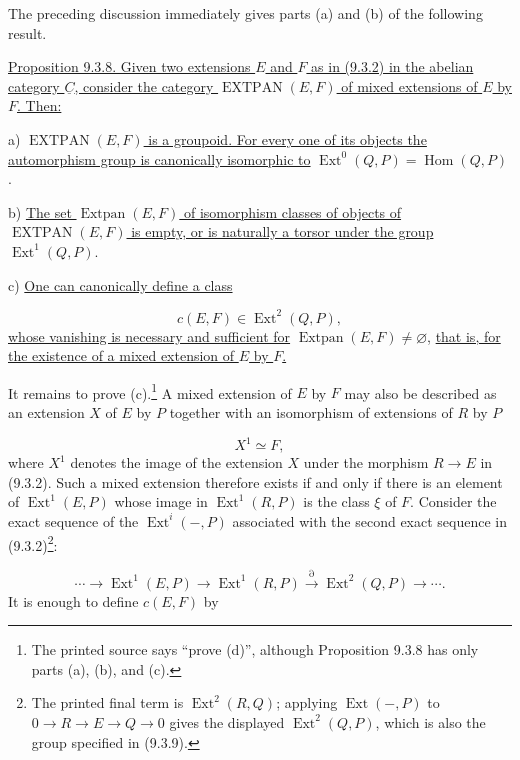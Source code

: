 The preceding discussion immediately gives parts (a) and (b) of the
following result.

\medskip
\noindent
\underline{Proposition 9.3.8. Given two extensions $E$ and $F$ as in
(9.3.2) in the abelian category $\underline C$, consider the category
$\operatorname{EXTPAN}(E,F)$ of mixed extensions of $E$ by $F$. Then:}

\smallskip
\noindent
a) \underline{$\operatorname{EXTPAN}(E,F)$ is a groupoid. For every one
of its objects the automorphism group is canonically isomorphic to}
$\operatorname{Ext}^0(Q,P)=\operatorname{Hom}(Q,P)$.

\smallskip
\noindent
b) \underline{The set $\operatorname{Extpan}(E,F)$ of isomorphism classes
of objects of $\operatorname{EXTPAN}(E,F)$ is empty, or is naturally a
torsor under the group} $\operatorname{Ext}^1(Q,P)$.

\smallskip
\noindent
c) \underline{One can canonically define a class}

\begin{equation}\tag{9.3.9}
c(E,F)\in\operatorname{Ext}^2(Q,P),
\end{equation}
\underline{whose vanishing is necessary and sufficient for}
$\operatorname{Extpan}(E,F)\neq\varnothing$, \underline{that is, for the
existence of a mixed extension of $E$ by $F$.}

It remains to prove (c).\footnote{The printed source says ``prove (d)'',
although Proposition 9.3.8 has only parts (a), (b), and (c).} A mixed
extension of $E$ by $F$ may also be described as an extension $X$ of $E$
by $P$ together with an isomorphism of extensions of $R$ by $P$

\begin{equation*}
X^1\simeq F,
\end{equation*}
where $X^1$ denotes the image of the extension $X$ under the morphism
$R\longrightarrow E$ in (9.3.2). Such a mixed extension therefore exists
if and only if there is an element of $\operatorname{Ext}^1(E,P)$ whose
image in $\operatorname{Ext}^1(R,P)$ is the class $\xi$ of $F$. Consider
the exact sequence of the $\operatorname{Ext}^i(-,P)$ associated with the
second exact sequence in (9.3.2)\footnote{The printed final term is
$\operatorname{Ext}^2(R,Q)$; applying $\operatorname{Ext}(-,P)$ to
$0\to R\to E\to Q\to0$ gives the displayed $\operatorname{Ext}^2(Q,P)$,
which is also the group specified in (9.3.9).}:

\begin{equation*}
\cdots\longrightarrow
\operatorname{Ext}^1(E,P)\longrightarrow
\operatorname{Ext}^1(R,P)
\xrightarrow{\partial}
\operatorname{Ext}^2(Q,P)\longrightarrow\cdots .
\end{equation*}
It is enough to define $c(E,F)$ by

